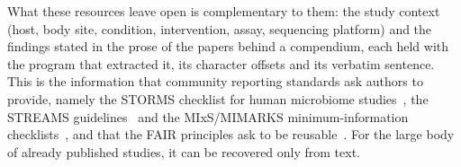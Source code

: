 \documentclass[referee,lineno,pdflatex,sn-vancouver-num]{sn-jnl}
\theoremstyle{thmstyleone}%
\theoremstyle{thmstyletwo}%
\theoremstyle{thmstylethree}%
\begin{document}
What these resources leave open is complementary to them: the study context
(host, body site, condition, intervention, assay, sequencing platform) and the
findings stated in the prose of the papers behind a compendium, each held with
the program that extracted it, its character offsets and its verbatim sentence.
This is the information that community reporting standards ask authors to
provide, namely the STORMS checklist for human microbiome
studies~\cite{mirzayi2021storms}, the STREAMS guidelines~\cite{kelliher2025streams}
and the MIxS/MIMARKS minimum-information checklists~\cite{yilmaz2011mixs}, and
that the FAIR principles ask to be reusable~\cite{wilkinson2016fair}. For the
large body of already published studies, it can be recovered only from text.
\end{document}
